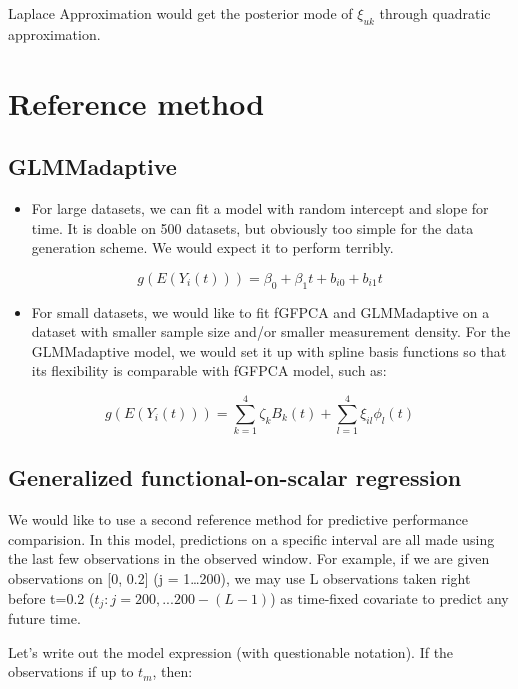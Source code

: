 \documentclass[
]{article}
\providecommand{\tightlist}{%
  \setlength{\itemsep}{0pt}\setlength{\parskip}{0pt}}
\begin{document}
Laplace Approximation would get the posterior mode of \(\xi_{uk}\)
through quadratic approximation.

\section{Reference method}\label{reference-method}

\subsection{GLMMadaptive}\label{glmmadaptive}

\begin{itemize}
\tightlist
\item
  For large datasets, we can fit a model with random intercept and slope
  for time. It is doable on 500 datasets, but obviously too simple for
  the data generation scheme. We would expect it to perform terribly.
\end{itemize}

\[g(E(Y_i(t))) = \beta_0+\beta_1t+b_{i0}+b_{i1}t\]

\begin{itemize}
\tightlist
\item
  For small datasets, we would like to fit fGFPCA and GLMMadaptive on a
  dataset with smaller sample size and/or smaller measurement density.
  For the GLMMadaptive model, we would set it up with spline basis
  functions so that its flexibility is comparable with fGFPCA model,
  such as:
\end{itemize}

\[g(E(Y_i(t))) = \sum_{k=1}^4\zeta_{k}B_k(t)+\sum_{l=1}^4\xi_{il}\phi_l(t)\]

\subsection{Generalized functional-on-scalar
regression}\label{generalized-functional-on-scalar-regression}

We would like to use a second reference method for predictive
performance comparision. In this model, predictions on a specific
interval are all made using the last few observations in the observed
window. For example, if we are given observations on {[}0, 0.2{]} (j =
1\ldots200), we may use L observations taken right before t=0.2
(\(t_j: j=200, ... 200-(L-1)\)) as time-fixed covariate to predict any
future time.

Let's write out the model expression (with questionable notation). If
the observations if up to \(t_m\), then:
\end{document}
